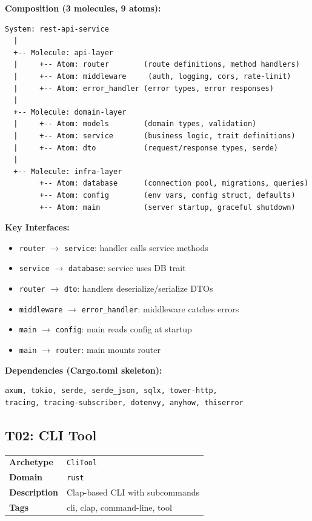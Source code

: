\documentclass[11pt,a4paper,twoside]{article}
\theoremstyle{definition}
\theoremstyle{plain}
\theoremstyle{remark}
\begin{document}
\medskip\noindent\textbf{Composition (3 molecules, 9 atoms):}

\begin{lstlisting}
System: rest-api-service
  |
  +-- Molecule: api-layer
  |     +-- Atom: router        (route definitions, method handlers)
  |     +-- Atom: middleware     (auth, logging, cors, rate-limit)
  |     +-- Atom: error_handler (error types, error responses)
  |
  +-- Molecule: domain-layer
  |     +-- Atom: models        (domain types, validation)
  |     +-- Atom: service       (business logic, trait definitions)
  |     +-- Atom: dto           (request/response types, serde)
  |
  +-- Molecule: infra-layer
        +-- Atom: database      (connection pool, migrations, queries)
        +-- Atom: config        (env vars, config struct, defaults)
        +-- Atom: main          (server startup, graceful shutdown)
\end{lstlisting}

\textbf{Key Interfaces:}
\begin{itemize}[nosep]
  \item \texttt{router} $\to$ \texttt{service}: handler calls service methods
  \item \texttt{service} $\to$ \texttt{database}: service uses DB trait
  \item \texttt{router} $\to$ \texttt{dto}: handlers deserialize/serialize DTOs
  \item \texttt{middleware} $\to$ \texttt{error\_handler}: middleware catches errors
  \item \texttt{main} $\to$ \texttt{config}: main reads config at startup
  \item \texttt{main} $\to$ \texttt{router}: main mounts router
\end{itemize}

\textbf{Dependencies (Cargo.toml skeleton):}
\begin{lstlisting}
axum, tokio, serde, serde_json, sqlx, tower-http,
tracing, tracing-subscriber, dotenvy, anyhow, thiserror
\end{lstlisting}

\subsection{T02: CLI Tool}\label{sec:t02}

\begin{tabularx}{\textwidth}{l X}
\toprule
\textbf{Archetype} & \texttt{CliTool} \\
\textbf{Domain} & \texttt{rust} \\
\textbf{Description} & Clap-based CLI with subcommands \\
\textbf{Tags} & cli, clap, command-line, tool \\
\bottomrule
\end{tabularx}
\end{document}

